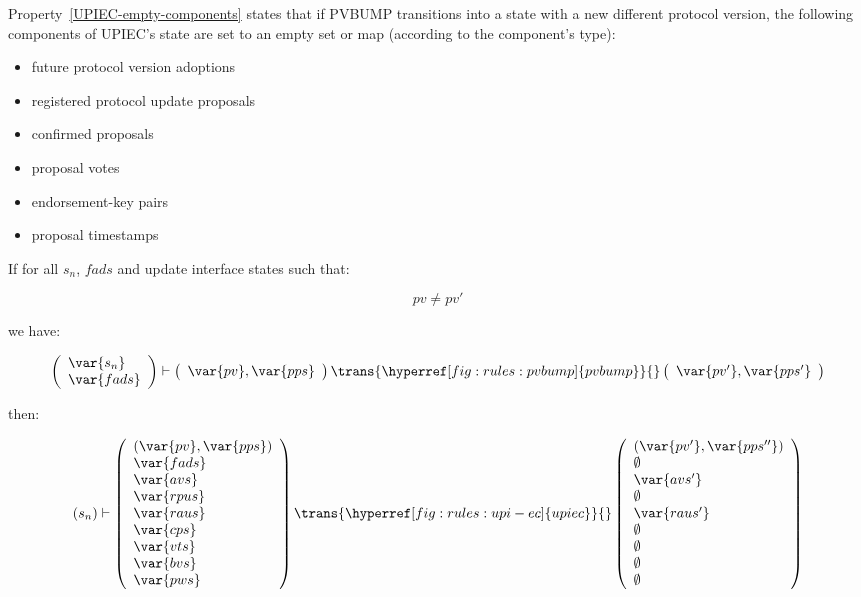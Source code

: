 Property~\ref{UPIEC-empty-components} states that if PVBUMP transitions into a
state with a new different protocol version, the following components of
UPIEC's state are set to an empty set or map (according to the component's
type):
%
\begin{itemize}
\item future protocol version adoptions
\item registered protocol update proposals
\item confirmed proposals
\item proposal votes
\item endorsement-key pairs
\item proposal timestamps
\end{itemize}

\begin{property}\label{UPIEC-empty-components}
  \textnormal{If for all $s_n$, $fads$ and update interface states such that:}

  $$
  pv \neq pv'
  $$

  \textnormal{we have:}
  
  $$
  \left(
    \begin{array}{l}
      \var{s_n}\\
      \var{fads}
    \end{array}
  \right)
  \vdash
  \left(
    \begin{array}{l}
      \var{pv}, \var{pps}\\
    \end{array}
  \right)
  \trans{\hyperref[fig:rules:pvbump]{pvbump}}{}
  \left(
    \begin{array}{l}
      \var{pv'}, \var{pps'}\\
    \end{array}
  \right)
  $$

  \textnormal{then:}

  $$
  (s_n)
  \vdash
  \left(
    \begin{array}{l}
      (\var{pv}, \var{pps})\\
      \var{fads}\\
      \var{avs}\\
      \var{rpus}\\
      \var{raus}\\
      \var{cps}\\
      \var{vts}\\
      \var{bvs}\\
      \var{pws}
    \end{array}
  \right)
  \trans{\hyperref[fig:rules:upi-ec]{upiec}}{}
  \left(
    \begin{array}{l}
      (\var{pv'}, \var{pps''})\\
      \emptyset\\
      \var{avs'}\\
      \emptyset\\
      \var{raus'}\\
      \emptyset\\
      \emptyset\\
      \emptyset\\
      \emptyset
    \end{array}
  \right)
  $$
  
\end{property}
